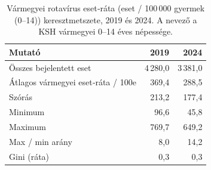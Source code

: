 \begin{table}[htbp]
\centering
\small
\begin{tabular}{p{6.2cm}rr}
\toprule
Mutató & 2019 & 2024 \\
\midrule
Összes bejelentett eset & 4\,280{,}0 & 3\,381{,}0 \\
Átlagos vármegyei eset‑ráta / 100e & 369{,}4 & 288{,}5 \\
Szórás & 213{,}2 & 177{,}4 \\
Minimum & 96{,}6 & 45{,}8 \\
Maximum & 769{,}7 & 649{,}2 \\
Max / min arány & 8{,}0 & 14{,}2 \\
Gini (ráta) & 0{,}3 & 0{,}3 \\
\bottomrule
\end{tabular}
\caption{Vármegyei rotavírus eset‑ráta (eset / 100\,000 gyermek (0--14)) keresztmetszete, 2019 és 2024. A nevező a KSH vármegyei 0--14 éves népessége.}
\label{tab:countyxs}
\end{table}
